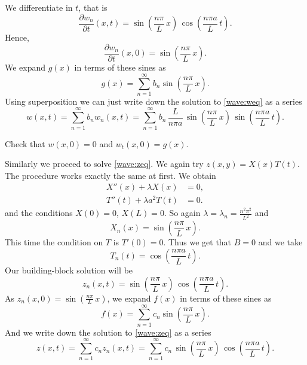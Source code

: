 \documentclass[12pt]{book}
\begin{document}
We differentiate in $t$, that is
\begin{equation*}
\frac{\partial w_n}{\partial t}(x,t) = 
\sin \left( \frac{n \pi}{L} \, x \right) \,
\cos \left( \frac{n \pi a}{L} \, t \right) .
\end{equation*}
Hence,
\begin{equation*}
\frac{\partial w_n}{\partial t}(x,0) =
\sin \left( \frac{n \pi}{L} \, x \right) .
\end{equation*}
We expand $g(x)$ in terms of these sines as
\begin{equation*}
g(x) =
\sum_{n=1}^\infty b_n \sin \left( \frac{n \pi}{L} \, x \right) .
\end{equation*}
Using superposition
we can just write down the solution to \eqref{wave:weq} as a series
\begin{equation*}
w(x,t) =
\sum_{n=1}^\infty
b_n
w_n(x,t)
=
\sum_{n=1}^\infty
b_n \,
\frac{L}{n \pi a} \,
\sin \left( \frac{n \pi}{L} \, x \right) \,
\sin \left( \frac{n \pi a}{L} \, t \right) .
\end{equation*}

\begin{exercise}
Check that $w(x,0) = 0$ and
$w_t(x,0) = g(x)$.
\end{exercise}

Similarly we proceed to solve \eqref{wave:zeq}.  We again try
$z(x,y) = X(x)T(t)$.  The procedure works exactly the same at first.
We obtain
\begin{align*}
X''(x) + \lambda X(x) &= 0 , \\
T''(t) + \lambda a^2 T(t) &= 0 .
\end{align*}
and the conditions $X(0) = 0$, $X(L) = 0$.  So again
$\lambda = \lambda_n = \frac{n^2 \pi^2}{L^2}$ and
\begin{equation*}
X_n(x) = \sin \left( \frac{n \pi}{L} \, x \right) .
\end{equation*}
This time
the condition on $T$ is $T'(0) = 0$.  Thus 
we get that $B = 0$ and we take
\begin{equation*}
T_n(t) = \cos \left( \frac{n \pi a}{L} \, t \right).
\end{equation*}
Our building-block solution will be
\begin{equation*}
z_n(x,t) = 
\sin \left( \frac{n \pi}{L} \, x \right) \,
\cos \left( \frac{n \pi a}{L} \, t \right) .
\end{equation*}
As $z_n(x,0) = \sin \left( \frac{n \pi}{L} \, x \right)$,
we expand $f(x)$ in terms of these sines as
\begin{equation*}
f(x) =
\sum_{n=1}^\infty c_n \sin \left( \frac{n \pi}{L} \, x \right) .
\end{equation*}
And we
write down the solution to \eqref{wave:zeq} as a series
\begin{equation*}
z(x,t) =
\sum_{n=1}^\infty
c_n
z_n(x,t)
=
\sum_{n=1}^\infty
c_n \,
\sin \left( \frac{n \pi}{L} \, x \right) \,
\cos \left( \frac{n \pi a}{L} \, t \right) .
\end{equation*}
\end{document}
